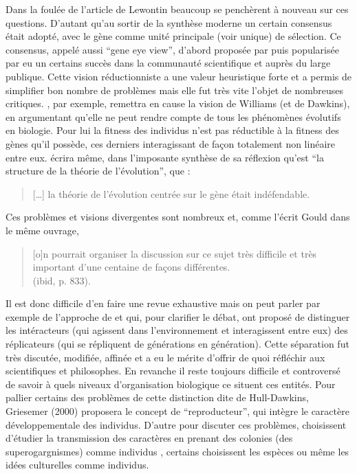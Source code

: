 Dans la foulée de l'article de Lewontin beaucoup se penchèrent à nouveau sur ces questions. D'autant qu'au sortir de la synthèse moderne un certain consensus était adopté, avec le gène comme unité principale (voir unique) de sélection. Ce consensus, appelé aussi ``gene eye view'', d'abord proposée par \cite{williams1966adaptationandnaturalselection} puis popularisée par \cite{dawkins76selfishgene} eu un certains succès dans la communauté scientifique et auprès du large publique. Cette vision réductionniste a une valeur heuristique forte et a permis de simplifier bon nombre de problèmes mais elle fut très vite l'objet de nombreuses critiques. \cite{wimsatt1980theunitsofselectionandthestructureofthemultilevelgenome}, par exemple, remettra en cause la vision de Williams (et de Dawkins), en argumentant qu'elle ne peut rendre compte de tous les phénomènes évolutifs en biologie. Pour lui la fitness des individus n'est pas réductible à la fitness des gènes qu'il possède, ces derniers interagissant de façon totalement non linéaire entre eux. \cite{gould2002thestructureofevolutionarytheory} écrira même, dans l'imposante synthèse de sa réflexion qu'est ``la structure de la théorie de l'évolution'', que :
\begin{quote}
	[\ldots] la théorie de l'évolution centrée sur le gène était indéfendable.\\
	\citep[p. 855]{gould2002thestructureofevolutionarytheory}
\end{quote}

Ces problèmes et visions divergentes sont nombreux et, comme l'écrit Gould dans le même ouvrage,
\begin{quote}
	[o]n pourrait organiser la discussion sur ce sujet très difficile et très important d'une centaine de façons différentes.\\
	(ibid, p. 833).
\end{quote}
Il est donc difficile d'en faire une revue exhaustive mais on peut parler par exemple de l'approche de \cite{dawkins76selfishgene} et \cite{hull1974philosophyofbiologicalscience} qui, pour clarifier le débat, ont proposé de distinguer les intéracteurs (qui agissent dans l'environnement et interagissent entre eux) des réplicateurs (qui se répliquent de générations en génération). Cette séparation fut très discutée, modifiée, affinée et a eu le mérite d'offrir de quoi réfléchir aux scientifiques et philosophes. En revanche il reste toujours difficile et controversé de savoir à quels niveaux d'organisation biologique ce situent ces entités. Pour pallier certains des problèmes de cette distinction dite de Hull-Dawkins, Griesemer (2000) proposera le concept de ``reproducteur'', qui intègre le caractère développementale des individus. D'autre pour discuter ces problèmes, choisissent d'étudier la transmission des caractères en prenant des colonies (des superogargnismes) comme individus \citep{wilson1989revivingsuperorganism}, certains choisissent les espèces ou même les idées culturelles \citep[p. 147]{godfrey2009darwinian} comme individus.


